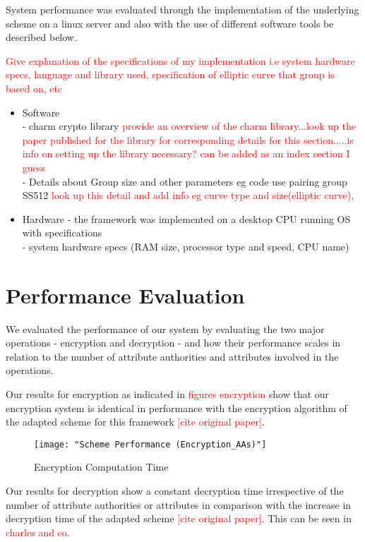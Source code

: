 System performance was evaluated through the implementation of the underlying scheme on a linux server and also with the use of different software tools be described below.

\textcolor{red}{Give explanation of the specifications of my implementation i.e system hardware specs, language and library used, specification of elliptic curve that group is based on, etc}

\begin{itemize}
	\item Software
	\\- charm crypto library  \textcolor{red}{provide an overview of the charm library...look up the paper published for the library for corresponding details for this section.....is info on setting up the library necessary? can be added as an index section I guess}
	\\- Details about Group size and other parameters eg code use pairing group SS512 \textcolor{red}{look up this detail and add info eg curve type and size(elliptic curve),}
	
	\item Hardware - the framework was implemented on a desktop CPU running  OS with specifications
	\\- system hardware specs (RAM size, processor type and speed, CPU name)
\end{itemize}


\section{Performance Evaluation}

We evaluated the performance of our system by evaluating the two major operations - encryption and decryption - and how their performance scales in relation to the number of attribute authorities and attributes involved in the operations.

Our results for encryption as indicated in \textcolor{red}{figures encryption} show that our encryption system is identical in performance with the encryption algorithm of the adapted scheme for this framework \textcolor{red}{[cite original paper]}.

\begin{figure}[]
	\centering
	\texttt{[image: "Scheme Performance (Encryption\_AAs)"]}
	\caption{Encryption Computation Time}
	\label{fig:res_enc_aas}
\end{figure}

Our results for decryption show a constant decryption time irrespective of the number of attribute authorities or attributes in comparison with the increase in decryption time of the adapted scheme \textcolor{red}{[cite original paper]}. This can be seen in \textcolor{red}{charles and co}.

